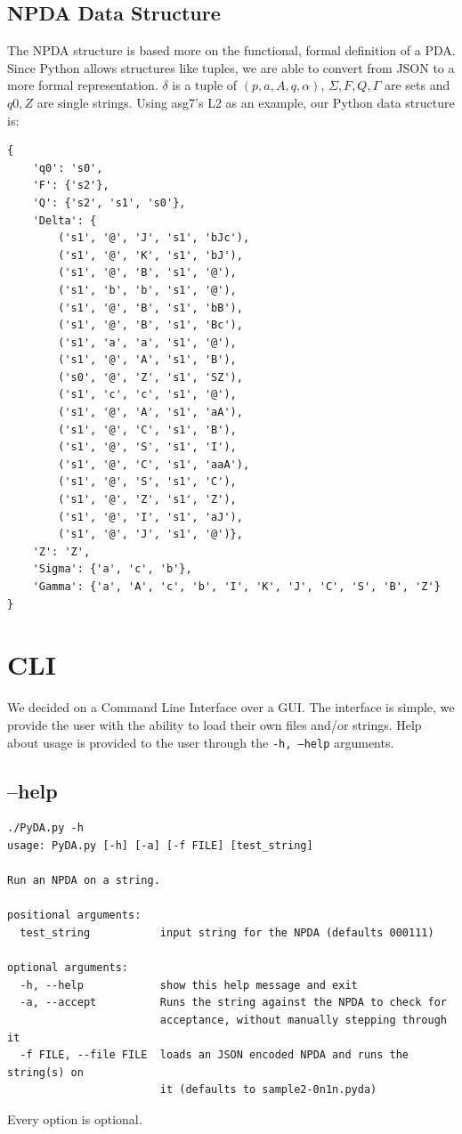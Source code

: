 \documentclass[a4paper]{article}
\begin{document}
\subsection{NPDA Data Structure}
The NPDA structure is based more on the functional, formal definition of a PDA.
Since Python allows structures like tuples, we are able to convert from JSON to
a more formal representation. $\delta$ is a tuple of $(p,a,A,q,\alpha)$,
$\Sigma, F, Q, \Gamma$ are sets and $q0, Z$ are single strings. Using asg7's L2
as an example, our Python data structure is:
\begin{verbatim}
{
    'q0': 's0',
    'F': {'s2'},
    'Q': {'s2', 's1', 's0'},
    'Delta': {
        ('s1', '@', 'J', 's1', 'bJc'),
        ('s1', '@', 'K', 's1', 'bJ'),
        ('s1', '@', 'B', 's1', '@'),
        ('s1', 'b', 'b', 's1', '@'),
        ('s1', '@', 'B', 's1', 'bB'),
        ('s1', '@', 'B', 's1', 'Bc'),
        ('s1', 'a', 'a', 's1', '@'),
        ('s1', '@', 'A', 's1', 'B'),
        ('s0', '@', 'Z', 's1', 'SZ'),
        ('s1', 'c', 'c', 's1', '@'),
        ('s1', '@', 'A', 's1', 'aA'),
        ('s1', '@', 'C', 's1', 'B'),
        ('s1', '@', 'S', 's1', 'I'),
        ('s1', '@', 'C', 's1', 'aaA'),
        ('s1', '@', 'S', 's1', 'C'),
        ('s1', '@', 'Z', 's1', 'Z'),
        ('s1', '@', 'I', 's1', 'aJ'),
        ('s1', '@', 'J', 's1', '@')},
    'Z': 'Z',
    'Sigma': {'a', 'c', 'b'},
    'Gamma': {'a', 'A', 'c', 'b', 'I', 'K', 'J', 'C', 'S', 'B', 'Z'}
}
\end{verbatim}
\section{CLI}
We decided on a Command Line Interface over a GUI. The interface is simple, we
provide the user with the ability to load their own files and/or strings. Help
about usage is provided to the user through the \texttt{-h, --help} arguments.
\subsection{--help}
\begin{verbatim}
./PyDA.py -h
usage: PyDA.py [-h] [-a] [-f FILE] [test_string]

Run an NPDA on a string.

positional arguments:
  test_string           input string for the NPDA (defaults 000111)

optional arguments:
  -h, --help            show this help message and exit
  -a, --accept          Runs the string against the NPDA to check for
                        acceptance, without manually stepping through it
  -f FILE, --file FILE  loads an JSON encoded NPDA and runs the string(s) on
                        it (defaults to sample2-0n1n.pyda)
\end{verbatim}
Every option is optional.
\end{document}
